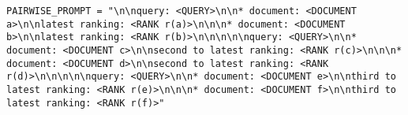 

\begin{lstlisting}[style=promptstyle]
PAIRWISE_PROMPT = "\n\nquery: <QUERY>\n\n* document: <DOCUMENT a>\n\nlatest ranking: <RANK r(a)>\n\n\n* document: <DOCUMENT b>\n\nlatest ranking: <RANK r(b)>\n\n\n\n\nquery: <QUERY>\n\n* document: <DOCUMENT c>\n\nsecond to latest ranking: <RANK r(c)>\n\n\n* document: <DOCUMENT d>\n\nsecond to latest ranking: <RANK r(d)>\n\n\n\n\nquery: <QUERY>\n\n* document: <DOCUMENT e>\n\nthird to latest ranking: <RANK r(e)>\n\n\n* document: <DOCUMENT f>\n\nthird to latest ranking: <RANK r(f)>"
\end{lstlisting}